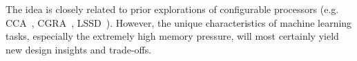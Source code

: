 \begin{itemize}
  The idea is closely related to prior explorations of configurable processors (e.g. CCA~\cite{cca}, CGRA~\cite{cgra}, LSSD~\cite{lssd}). However, the unique characteristics of machine learning tasks, especially the extremely high memory pressure, will most certainly yield new design insights and trade-offs.

\end{itemize}
















